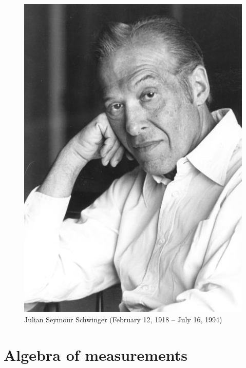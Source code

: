 \begin{refsection}
\begin{figure}
   \centering
   \includegraphics[scale=.35]{./Images/schwinger}
   \caption{Julian Seymour Schwinger (February 12, 1918 -- July 16, 1994) }
\end{figure}

\section{Algebra of measurements}




\printbibliography[heading=subbibliography]
\end{refsection}
